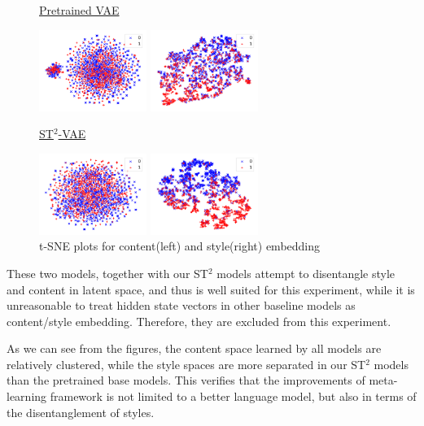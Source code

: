 \begin{figure}[th]
\begin{minipage}{0.45\linewidth}
	\end{minipage}
	\underline{\small Pretrained VAE}\\
	\begin{minipage}{0.45\linewidth}
		\centering
		\includegraphics[width=3.5cm]{./images/vae_pre_c.pdf}
	\end{minipage}
	\begin{minipage}{0.45\linewidth}
		\centering
		\includegraphics[width=3.5cm]{./images/vae_pre_s.pdf}
	\end{minipage}
	\underline{\small ST$^2$-VAE}\\
	\begin{minipage}{0.45\linewidth}
		\centering
		\includegraphics[width=3.5cm]{./images/vae_maml_c.pdf}
	\end{minipage}
	\begin{minipage}{0.45\linewidth}
		\centering
		\includegraphics[width=3.5cm]{./images/vae_maml_s.pdf}
	\end{minipage}
	\caption{t-SNE plots for content(left) and style(right) embedding}\label{fig:tsne}
\end{figure}


These two models, together with our ST$^2$ models attempt to disentangle style and content in latent space, and thus is well suited for this experiment, while it is unreasonable to treat hidden state vectors in other baseline models as content/style embedding. Therefore, they are excluded from this experiment.

As we can see from the figures, the content space learned by all models are relatively clustered, while the style spaces are more separated in our ST$^2$ models than the pretrained base models. This verifies that the improvements of meta-learning framework is not limited to a better language model, but also in terms of the disentanglement of styles.


